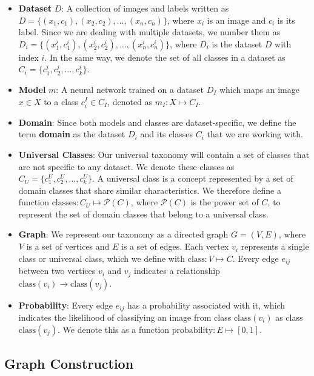 \begin{itemize}
    \item \textbf{Dataset} $D$: A collection of images and labels
          written as $D = \{(x_1, c_1), (x_2, c_2), \ldots, (x_n, c_n)\}$,
          where $x_i$ is an image and $c_i$ is its label.
          Since we are dealing with multiple datasets, we number them
          as $D_i = \{(x_1^i, c_1^i), (x_2^i, c_2^i), \ldots, (x_n^i, c_n^i)\}$,
          where $D_i$ is the dataset $D$ with index $i$.
          In the same way, we denote the set of all classes in a dataset as $C_i = \{c_1^i, c_2^i, \ldots, c_k^i\}$.
    \item \textbf{Model} $m$: A neural network trained on a dataset $D_I$
          which maps an image $x\in X$ to a class $c_i^I\in C_I$, denoted as $m_I: X \mapsto C_I$.
    \item \textbf{Domain}: Since both models and classes are dataset-specific,
          we define the term \textbf{domain} as the dataset $D_i$ and its classes $C_i$
          that we are working with.
    \item \textbf{Universal Classes}: Our universal taxonomy will contain a set of classes
          that are not specific to any dataset.
          We denote these classes as $C_U = \{c_1^U, c_2^U, \ldots, c_k^U\}$.
          A universal class is a concept represented by a set of domain classes
          that share similar characteristics. We therefore define a function
          $\text{classes}: C_U \mapsto \mathcal{P}(C)$, where $\mathcal{P}(C)$ is the power set of $C$,
          to represent the set of domain classes that belong to a universal class.
    \item \textbf{Graph}: We represent our taxonomy as a directed graph $G = (V, E)$,
          where $V$ is a set of vertices and $E$ is a set of edges.
          Each vertex $v_i$ represents a single class or universal class,
          which we define with $\text{class}: V \mapsto C$.
          Every edge $e_{ij}$ between two vertices $v_i$ and $v_j$ indicates
          a relationship $\text{class}(v_i) \rightarrow \text{class}(v_j)$.
    \item \textbf{Probability}: Every edge $e_{ij}$ has a probability associated with it,
          which indicates the likelihood of classifying an image from class $\text{class}(v_i)$
          as class $\text{class}(v_j)$.
          We denote this as a function $\text{probability}: E \mapsto [0, 1]$.
\end{itemize}

\subsection{Graph Construction} \label{sec:graph_construction}

